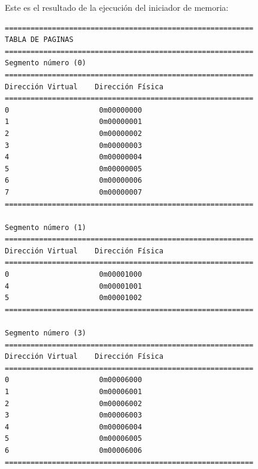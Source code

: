 \vspace{0.5cm}
\noindent
Este es el resultado de la ejecución del iniciador de memoria:
\begin{verbatim}
==========================================================
TABLA DE PAGINAS
==========================================================
Segmento número (0)
==========================================================
Dirección Virtual    Dirección Física    
==========================================================
0                     0m00000000            
1                     0m00000001            
2                     0m00000002            
3                     0m00000003            
4                     0m00000004            
5                     0m00000005            
6                     0m00000006            
7                     0m00000007            
==========================================================

Segmento número (1)
==========================================================
Dirección Virtual    Dirección Física    
==========================================================
0                     0m00001000            
4                     0m00001001            
5                     0m00001002            
==========================================================

Segmento número (3)
==========================================================
Dirección Virtual    Dirección Física    
==========================================================
0                     0m00006000            
1                     0m00006001            
2                     0m00006002            
3                     0m00006003            
4                     0m00006004            
5                     0m00006005            
6                     0m00006006            
==========================================================





\end{verbatim}
